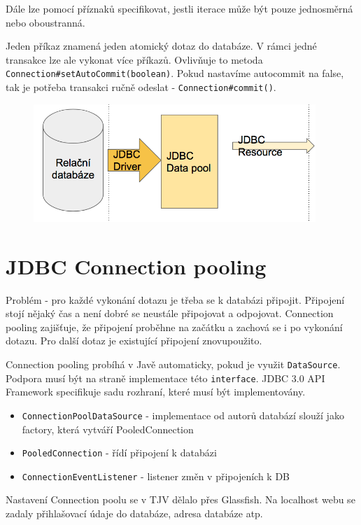 \documentclass{szzclass}
\begin{document}
Dále lze pomocí příznaků specifikovat, jestli iterace může být pouze jednosměrná nebo oboustranná.

Jeden příkaz znamená jeden atomický dotaz do databáze. V rámci jedné transakce lze ale vykonat více příkazů. Ovlivňuje to metoda \texttt{Connection#setAutoCommit(boolean)}. Pokud nastavíme autocommit na false, tak je potřeba transakci ručně odeslat - \texttt{Connection#commit()}.

\begin{figure}[h!]
\includegraphics[width=0.95\textwidth]{topics/bi-wsi-si-28/images/image2.png}
\end{figure}

\section{JDBC Connection pooling}
Problém - pro každé vykonání dotazu je třeba se k databázi připojit. Připojení stojí nějaký čas a není dobré se neustále připojovat a odpojovat. Connection pooling zajišťuje, že připojení proběhne na začátku a zachová se i po vykonání dotazu. Pro další dotaz je existující připojení znovupoužito.

Connection pooling probíhá v Javě automaticky, pokud je využit \texttt{DataSource}. Podpora musí být na straně implementace této \texttt{interface}. JDBC 3.0 API Framework specifikuje sadu rozhraní, které musí být implementovány.
\begin{itemize}
\item \texttt{ConnectionPoolDataSource} - implementace od autorů databází slouží jako factory, která vytváří PooledConnection
\item \texttt{PooledConnection} - řídí připojení k databázi
\item \texttt{ConnectionEventListener} - listener změn v připojeních k DB
\end{itemize}

Nastavení Connection poolu se v TJV dělalo přes Glassfish. Na localhost webu se zadaly přihlašovací údaje do databáze, adresa databáze atp.
\end{document}
